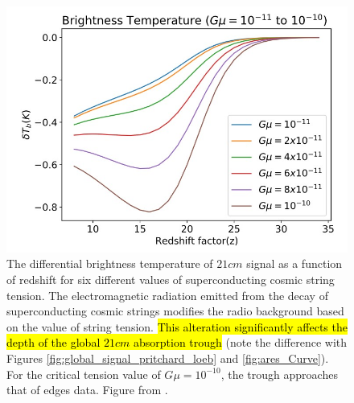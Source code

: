 \documentclass[12pt, TexShade, letterpaper]{report}
\begin{document}
\begin{figure}[h!]
    \centering
    \includegraphics[scale = 0.8]{21cm_cosmic_string.jpg}
    \caption[The global $21cm$ for different values of superconducting cosmic string tension]{The differential brightness temperature of $21cm$ signal as a function of redshift for six different values of superconducting cosmic string tension. The electromagnetic radiation emitted from the decay of superconducting cosmic strings modifies the radio background based on the value of string tension. \hl{This alteration significantly affects the depth of the global $21cm$ absorption trough} (note the difference with Figures \ref{fig:global_signal_pritchard_loeb} and \ref{fig:ares_Curve}). For the critical tension value of $G\mu = 10 ^{-10}$, the trough approaches that of \gls{edges} data. Figure from \cite{cosmic_string_jordan_robert}.}
    \label{fig:21cm_cosmic_string}
\end{figure}

\end{document}
